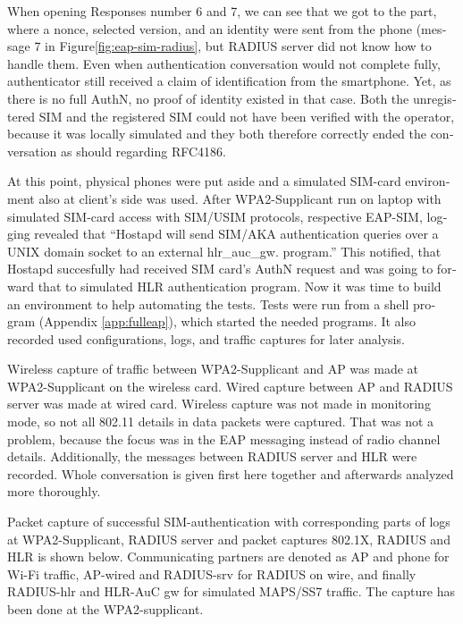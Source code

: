 \documentclass[12pt,a4paper,english]{tutthesis}
\begin{document}
\begin{otherlanguage}{english}
When opening Responses number 6 and 7, we can see that we got to the
part, where a nonce, selected version, and an identity were sent from
the phone (message 7 in Figure\ref{fig:eap-sim-radius}, but RADIUS server
did not know how to handle them.
 Even when authentication conversation would not complete fully,
authenticator still received a claim of identification from the
smartphone. Yet, as there is no full AuthN, no proof of identity existed in
that case.
Both the unregistered SIM and the registered SIM could not have been
verified with the
operator, because it was locally simulated and they both therefore
correctly  ended the conversation as should regarding
RFC4186\cite{rfc4186}.

At this point, physical phones were put aside and a simulated SIM-card
environment also at client's  side was used.
After WPA2-Supplicant run on laptop with simulated SIM-card access 
with SIM/USIM protocols, respective EAP-SIM, logging revealed that
``Hostapd will send SIM/AKA authentication queries over a UNIX domain socket to an external hlr\_auc\_gw.
program.''
This notified, that Hostapd succesfully had received SIM
card's AuthN request and was going to forward that to simulated HLR
authentication program. Now it was time to build an
environment to help automating the tests.
Tests were run from a shell program (Appendix \ref{app:fulleap}), which
started the needed programs. It also recorded used configurations, logs,
and traffic captures for later analysis.



Wireless capture of traffic between WPA2-Supplicant and AP was made at
WPA2-Supplicant on the wireless card. Wired capture between AP and
RADIUS server was made at wired card. Wireless capture was
not made in monitoring mode, so not all 802.11 details in
data packets were captured\cite{wireshark-capture}.
That was not a problem, because the focus was 
in the EAP messaging instead of radio channel details.
Additionally, the messages between RADIUS server and HLR were recorded.
Whole conversation is given first here together and afterwards analyzed more
thoroughly.



Packet capture of successful SIM-authentication with corresponding
parts of logs at WPA2-Supplicant, RADIUS server and packet captures
802.1X, RADIUS and HLR is shown below.  Communicating partners are
denoted as AP and phone for Wi-Fi traffic, AP-wired and
RADIUS-srv for RADIUS on wire, and finally RADIUS-hlr and HLR-AuC gw
for simulated MAPS/SS7 traffic.
The capture has been done at the WPA2-supplicant.


\end{otherlanguage}
\end{document}
